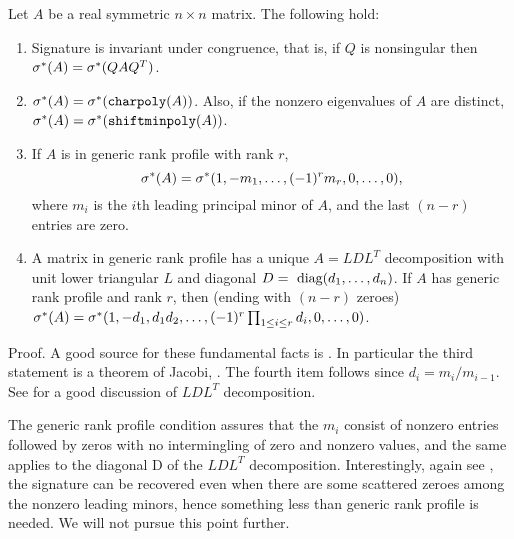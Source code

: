 \documentclass{acm_proc_article-sp}
\begin{document}
\begin{theorem} {\label{theorem:sig}}
Let $A$ be a real symmetric $n\times n$ matrix.
The following hold:
\begin{enumerate}
\item 
Signature is invariant under congruence, that is, if 
$Q$ is nonsingular then $\sigma^{*}(A) = \sigma^{*}(QAQ^T)$.
\item
$\sigma^{*}(A) = \sigma^{*}(\mbox{\tt charpoly}(A))$.
Also, if the nonzero eigenvalues of $A$ are distinct,
$\sigma^{*}(A) = \sigma^{*}(\mbox{\tt shiftminpoly}(A))$.
\item
If $A$ is in generic rank profile with rank $r$, 
$$\sigma^{*}(A) = \sigma^{*}(1, -m_1, \ldots, (-1)^r m_r, 0, \ldots, 0),$$
where $m_i$ is the $i$th leading principal minor of $A$, and the last $(n-r)$
entries are zero.
\item
A matrix in generic rank profile has a unique $A = LDL^T$ decomposition with 
unit lower triangular $L$ and diagonal $D = \mbox{ diag}(d_1, \ldots, d_n)$.  If $A$
has generic rank profile and rank $r$, then (ending with $(n-r)$ zeroes)\\
$\sigma^{*}(A) = 
\sigma^{*}(1, -d_1, d_1 d_2, \ldots, (-1)^r\prod_{1 \leq i \leq r}d_i, 0, \ldots, 0)$. 
\end{enumerate}
\end{theorem}

Proof.  A good source for these fundamental facts is \cite{gantmacher}.
In particular the third statement is a theorem of Jacobi, \cite[Chapter X, \S 3, theorem 2]{gantmacher}.
The fourth item follows since $d_i = m_i/m_{i-1}$.
See \cite[Chapter 4]{GoLo96} for a good discussion of $LDL^T$ decomposition.
\QED

The generic rank profile condition assures that the $m_i$ consist of nonzero entries followed
by zeros with no intermingling of zero and nonzero values, and the same applies to the 
diagonal D of the $LDL^T$ decomposition.
Interestingly, again see \cite{gantmacher}, the 
signature can be recovered even when there are some scattered zeroes among the nonzero 
leading minors, hence something less than generic rank profile is needed.  
We will not pursue this point further. 


\end{document}
